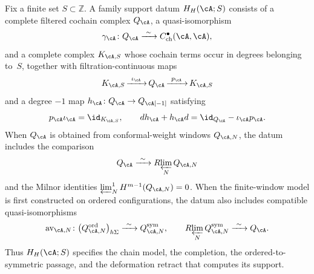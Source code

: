 \begin{definition}
\label{def:theorem-h-collision-depth-package}
Fix a finite set \(S\subset\mathbb Z\).  A family support datum
\(H_H(\cA;S)\) consists of a complete filtered cochain complex
\(Q_\cA\), a quasi-isomorphism
\[
 \gamma_\cA\colon Q_\cA
 \xrightarrow{\ \sim\ }
 C^\bullet_{\mathrm{ch}}(\cA,\cA),
\]
and a complete complex \(K_{\cA,S}\) whose cochain terms occur in
degrees belonging to~\(S\), together
with filtration-continuous maps
\[
 K_{\cA,S}
 \mathop{\xrightarrow{\ \iota_\cA\ }}
 Q_\cA
 \mathop{\xrightarrow{\ p_\cA\ }}
 K_{\cA,S}
\]
and a degree \(-1\) map \(h_\cA\colon Q_\cA\to Q_\cA[-1]\)
satisfying
\begin{equation}\label{eq:theorem-h-global-retract}
 p_\cA\iota_\cA=\id_{K_{\cA,S}},
 \qquad
 d h_\cA+h_\cA d
 =\id_{Q_\cA}-\iota_\cA p_\cA.
\end{equation}
When \(Q_\cA\) is obtained from conformal-weight windows
\(Q_{\cA,N}\), the datum includes the comparison
\[
 Q_\cA\xrightarrow{\ \sim\ }R\!\varprojlim_N Q_{\cA,N}
\]
and the Milnor identities
\(\varprojlim_N^1H^{m-1}(Q_{\cA,N})=0\).
When the finite-window model is first constructed on ordered
configurations, the datum also includes compatible quasi-isomorphisms
\[
 \operatorname{av}_{\cA,N}\colon
 \bigl(Q^{\mathrm{ord}}_{\cA,N}\bigr)_{h\Sigma}
 \xrightarrow{\ \sim\ }Q^{\mathrm{sym}}_{\cA,N},
 \qquad
 R\!\varprojlim_NQ^{\mathrm{sym}}_{\cA,N}
 \xrightarrow{\ \sim\ }Q_\cA.
\]
Thus \(H_H(\cA;S)\) specifies the chain model, the completion, the
ordered-to-symmetric passage, and the deformation retract that
computes its support.
\end{definition}

